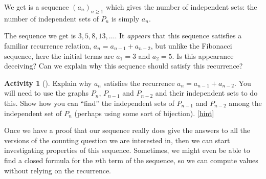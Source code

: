 \documentclass[10pt,]{book}
\theoremstyle{plain}
\theoremstyle{definition}
\theoremstyle{definition}
\theoremstyle{definition}
\newtheorem{activity}[project]{Activity}
\numberwithin{equation}{chapter}
\begin{document}
\hypertarget{p-886}{}%
We get is a sequence \((a_n)_{n \ge 1}\) which gives the number of independent sets: the number of independent sets of \(P_n\) is simply \(a_n\).%
\par
\hypertarget{p-887}{}%
The sequence we get is \(3, 5, 8, 13, \ldots\).  It \emph{appears} that this sequence satisfies a familiar recurrence relation, \(a_n = a_{n-1} + a_{n-2}\), but unlike the Fibonacci sequence, here the initial terms are \(a_1 = 3\) and \(a_2 = 5\).  Is this appearance deceiving?  Can we explain why this sequence should satisfy this recurrence?%
\begin{activity}[]\label{activity-126}
\hypertarget{p-888}{}%
Explain why \(a_n\) satisfies the recurrence \(a_n = a_{n-1} + a_{n-2}\).  You will need to use the graphs \(P_n\), \(P_{n-1}\) and \(P_{n-2}\) and their independent sets to do this.  Show how you can ``find'' the independent sets of \(P_{n-1}\) and \(P_{n-2}\) among the independent set of \(P_{n}\) (perhaps using some sort of bijection).%
\hfill{\tiny\hyperlink{a-133}{[hint]}\hypertarget{q-133}{}}\end{activity}
\hypertarget{p-890}{}%
Once we have a proof that our sequence really does give the answers to all the versions of the counting question we are interested in, then  we can start investigating properties of this sequence.  Sometimes, we might even be able to find a closed formula for the \(n\)th term of the sequence, so we can compute values without relying on the recurrence.%
\typeout{************************************************}
\typeout{************************************************}
\end{document}

